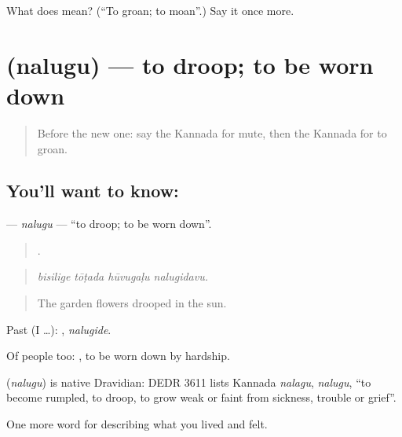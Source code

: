 \begin{tcolorbox}[breakable,colback=teal!4,colframe=teal!35!black,title={Before you move on}]
What does  mean? (\textquotedblleft{}To groan; to moan\textquotedblright{}.) Say it once more.
\end{tcolorbox}
\section[\texorpdfstring{\kn{ನಲುಗು} (nalugu)}{ನಲುಗು (nalugu)}]{ (nalugu) — to droop; to be worn down}

\label{lesson:KA-C515-nalugu}



\begin{quote}
Before the new one: say the Kannada for mute, then the Kannada for to groan.
\end{quote}

\subsection*{You'll want to know: }
\textbf{} — \emph{nalugu} — \textquotedblleft{}to droop; to be worn down\textquotedblright{}.

\begin{quote}
   .
\end{quote}

\begin{quote}
\emph{bisilige tōṭada hūvugaḷu nalugidavu.}
\end{quote}

\begin{quote}
The garden flowers drooped in the sun.
\end{quote}

Past (I …): , \emph{nalugide}.

Of people too:  , to be worn down by hardship.

\begin{cousinweb}
\textbf{} (\emph{nalugu}) is native Dravidian: DEDR 3611 lists Kannada \emph{nalagu}, \emph{nalugu}, \textquotedblleft{}to become rumpled, to droop, to grow weak or faint from sickness, trouble or grief\textquotedblright{}.
\end{cousinweb}

\begin{grammarlens}[title={What you've built}]
One more word for describing what you lived and felt.
\end{grammarlens}

